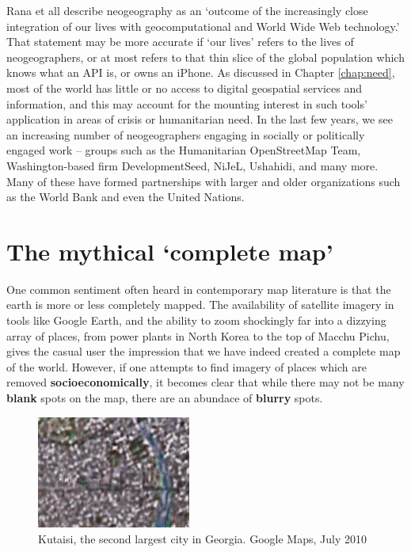 \documentclass[11pt]{report}
\begin{document}

Rana et all describe neogeography as an `outcome of the increasingly close integration of our lives with geocomputational and World Wide Web technology.' That statement may be more accurate if `our lives' refers to the lives of neogeographers, or at most refers to that thin slice of the global population which knows what an API is, or owns an iPhone. As discussed in Chapter \ref{chap:need}, most of the world has little or no access to digital geospatial services and information, and this may account for the mounting interest in such tools' application in areas of crisis or humanitarian need. In the last few years, we see an increasing number of neogeographers engaging in socially or politically engaged work -- groups such as the Humanitarian OpenStreetMap Team, Washington-based firm DevelopmentSeed, NiJeL, Ushahidi, and many more. Many of these have formed partnerships with larger and older organizations such as the World Bank and even the United Nations. 

\section{The mythical `complete map'}

One common sentiment often heard in contemporary map literature is that the earth is more or less completely mapped. The availability of satellite imagery in tools like Google Earth, and the ability to zoom shockingly far into a dizzying array of places, from power plants in North Korea to the top of Macchu Pichu, gives the casual user the impression that we have indeed created a complete map of the world. However, if one attempts to find imagery of places which are removed \textbf{socioeconomically}, it becomes clear that while there may not be many \textbf{blank} spots on the map, there are an abundace of \textbf{blurry} spots. 

\begin{figure}
	\begin{flushright}
		\includegraphics[width=0.45\textwidth]{images/kutaisi.png}
	\caption{Kutaisi, the second largest city in Georgia. Google Maps, July 2010}
	\end{flushright}
\end{figure}
\end{document}
